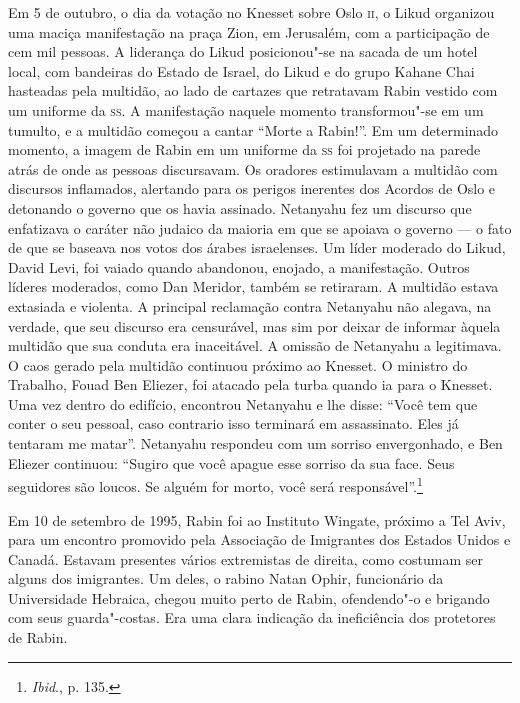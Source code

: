 Em 5 de outubro, o dia da votação no Knesset sobre Oslo \textsc{ii}, o Likud
organizou uma maciça manifestação na praça Zion, em Jerusalém, com a
participação de cem mil pessoas. A liderança do Likud posicionou"-se na
sacada de um hotel local, com bandeiras do Estado de Israel, do Likud e
do grupo Kahane Chai hasteadas pela multidão, ao lado de cartazes que
retratavam Rabin vestido com um uniforme da \textsc{ss}. A manifestação naquele
momento transformou"-se em um tumulto, e a multidão começou a cantar
``Morte a Rabin!''. Em um determinado momento, a imagem de Rabin em um
uniforme da \textsc{ss} foi projetado na parede atrás de onde as pessoas
discursavam. Os oradores estimulavam a multidão com discursos
inflamados, alertando para os perigos inerentes dos Acordos de Oslo e
detonando o governo que os havia assinado. Netanyahu fez um discurso que
enfatizava o caráter não judaico da maioria em que se apoiava o governo
--- o fato de que se baseava nos votos dos árabes israelenses. Um líder
moderado do Likud, David Levi, foi vaiado quando abandonou, enojado, a
manifestação. Outros líderes moderados, como Dan Meridor, também se
retiraram. A multidão estava extasiada e violenta. A principal
reclamação contra Netanyahu não alegava, na verdade, que seu discurso era
censurável, mas sim por deixar de informar àquela multidão que sua
conduta era inaceitável. A omissão de Netanyahu a legitimava. O caos
gerado pela multidão continuou próximo ao Knesset. O ministro do
Trabalho, Fouad Ben Eliezer, foi atacado pela turba quando ia para o
Knesset. Uma vez dentro do edifício, encontrou Netanyahu e lhe disse:
``Você tem que conter o seu pessoal, caso contrario isso terminará em
assassinato. Eles já tentaram me matar''. Netanyahu respondeu com um
sorriso envergonhado, e Ben Eliezer continuou: ``Sugiro que você apague
esse sorriso da sua face. Seus seguidores são loucos. Se alguém for
morto, você será responsável''.\footnote{\textit{Ibid}., p. 135.}

Em 10 de setembro de 1995, Rabin foi ao Instituto Wingate, próximo a Tel
Aviv, para um encontro promovido pela Associação de Imigrantes dos
Estados Unidos e Canadá. Estavam presentes vários extremistas de
direita, como costumam ser alguns dos imigrantes. Um deles, o rabino
Natan Ophir, funcionário da Universidade Hebraica, chegou muito perto de
Rabin, ofendendo"-o e brigando com seus guarda"-costas. Era uma clara
indicação da ineficiência dos protetores de Rabin.

